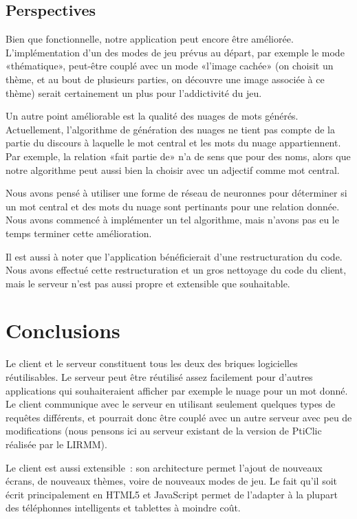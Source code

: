 \documentclass[a4paper,11pt,french]{article}
\begin{document}
\subsection{Perspectives}

Bien que fonctionnelle, notre application peut encore être améliorée. L'implémentation d'un des modes de jeu prévus au départ, par exemple
le mode «thématique», peut-être couplé avec un mode «l'image cachée» (on choisit un thème, et au bout de plusieurs parties, on découvre une
image associée à ce thème) serait certainement un plus pour l'addictivité du jeu.

Un autre point améliorable est la qualité des nuages de mots générés. Actuellement, l'algorithme de génération des nuages ne tient pas
compte de la partie du discours à laquelle le mot central et les mots du nuage appartiennent. Par exemple, la relation «fait partie de» n'a
de sens que pour des noms, alors que notre algorithme peut aussi bien la choisir avec un adjectif comme mot central.

Nous avons pensé à utiliser une forme de réseau de neuronnes pour déterminer si un mot central et des mots du nuage sont pertinants pour une
relation donnée. Nous avons commencé à implémenter un tel algorithme, mais n'avons pas eu le temps terminer cette amélioration.

Il est aussi à noter que l'application bénéficierait d'une restructuration du code. Nous avons effectué cette restructuration et un gros
nettoyage du code du client, mais le serveur n'est pas aussi propre et extensible que souhaitable.

\section{Conclusions}

Le client et le serveur constituent tous les deux des briques logicielles réutilisables. Le serveur peut être réutilisé assez facilement
pour d'autres applications qui souhaiteraient afficher par exemple le nuage pour un mot donné. Le client communique avec le serveur en
utilisant seulement quelques types de requêtes différents, et pourrait donc être couplé avec un autre serveur avec peu de modifications
(nous pensons ici au serveur existant de la version de PtiClic réalisée par le LIRMM).

Le client est aussi extensible~: son architecture permet l'ajout de nouveaux écrans, de nouveaux thèmes, voire de nouveaux modes de jeu. Le
fait qu'il soit écrit principalement en HTML5 et JavaScript permet de l'adapter à la plupart des téléphonnes intelligents et tablettes à
moindre coût.
\end{document}
